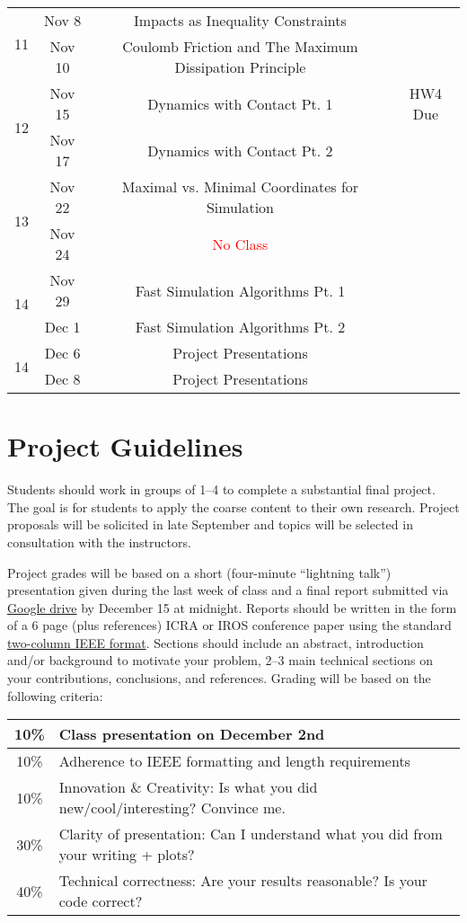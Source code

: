 \documentclass[11pt,letterpaper]{article}
\begin{document}
\begin{tabular}{c|c|c|c}
	 \hline
	\multirow{2}{*}{11}  & Nov 8 & Impacts as Inequality Constraints & \\
	 & Nov 10 & Coulomb Friction and The Maximum Dissipation Principle  &   \\
	 \hline
	\multirow{2}{*}{12}  & Nov 15 & Dynamics with Contact Pt. 1 & HW4 Due \\
	 & Nov 17 & Dynamics with Contact Pt. 2 &   \\
	 \hline
	\multirow{2}{*}{13}  & Nov 22 & Maximal vs. Minimal Coordinates for Simulation & \\
	 & Nov 24 & \textcolor{red}{No Class} & \\
	 \hline
	 \multirow{2}{*}{14}  & Nov 29 & Fast Simulation Algorithms Pt. 1 &  \\
	 & Dec 1 & Fast Simulation Algorithms Pt. 2 &   \\
	 \hline
	\multirow{2}{*}{14}  & Dec 6 & Project Presentations &  \\
	 & Dec 8 & Project Presentations &   \\
\end{tabular}

\section*{Project Guidelines}

Students should work in groups of 1--4 to complete a substantial final project. The goal is for students to apply the coarse content to their own research. Project proposals will be solicited in late September and topics will be selected in consultation with the instructors.

\medskip
\noindent
Project grades will be based on a short (four-minute ``lightning talk'') presentation given during the last week of class and a final report submitted via \href{https://forms.gle/6uj9E8XkzP8mAh6v9}{Google drive} by December 15 at midnight. Reports should be written in the form of a 6 page (plus references) ICRA or IROS conference paper using the standard \href{https://www.ieee.org/conferences/publishing/templates.html}{two-column IEEE format}. Sections should include an abstract, introduction and/or background to motivate your problem, 2--3 main technical sections on your contributions, conclusions, and references. Grading will be based on the following criteria:
\newline
\newline
\begin{tabular}{|c|l|}
\hline
10\% & Class presentation on December 2nd\\
\hline
10\% & Adherence to IEEE formatting and length requirements \\
\hline
10\% & Innovation \& Creativity: Is what you did new/cool/interesting? Convince me. \\
\hline
30\% & Clarity of presentation: Can I understand what you did from your writing + plots? \\
\hline
40\% & Technical correctness: Are your results reasonable? Is your code correct? \\
\hline	
\end{tabular}
\end{document}
